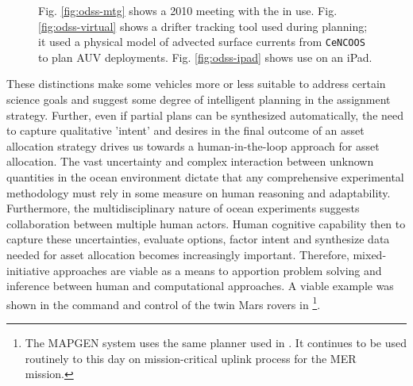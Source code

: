 \begin{figure}
\centering
{}
\caption{\small Fig. \ref{fig:odss-mtg} shows a 2010 \can meeting with
  the \od in use. Fig. \ref{fig:odss-virtual} shows a drifter tracking
  tool used during \can planning; it used a physical model of advected
  surface currents from \texttt{CeNCOOS} \cite{cencoos} to plan AUV
  deployments. Fig. \ref{fig:odss-ipad} shows \od use on an iPad.}
\label{fig:odss2}
\end{figure}


These distinctions make some vehicles more or less suitable to address
certain science goals and suggest some degree of intelligent planning
in the assignment strategy. Further, even if partial plans can be
synthesized automatically, the need to capture qualitative 'intent'
and desires in the final outcome of an asset allocation strategy
drives us towards a human-in-the-loop approach for asset
allocation. The vast uncertainty and complex interaction between
unknown quantities in the ocean environment dictate that any
comprehensive experimental methodology must rely in some measure on
human reasoning and adaptability.  Furthermore, the multidisciplinary
nature of ocean experiments suggests collaboration between multiple
human actors. Human cognitive capability then to capture these
uncertainties, evaluate options, factor intent and synthesize data
needed for asset allocation becomes increasingly important. Therefore,
mixed-initiative approaches are viable as a means to apportion problem
solving and inference between human and computational approaches. A
viable example was shown in the command and control of the twin Mars
rovers in \cite{aichang04,bresina05,bresina05a}\footnote{The MAPGEN
  system uses the same \eu planner used in \rxe. It continues to be
  used routinely to this day on mission-critical uplink process for
  the MER mission.}.

